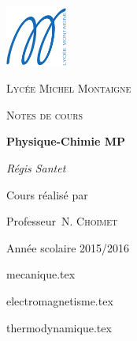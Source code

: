 \documentclass[12pt]{book}
\theoremstyle{definition}
\theoremstyle{remark}
\begin{document}
\begin{titlepage}
    \centering
    \includegraphics[width=0.15\textwidth]{img/logo_lycee_michel_montaigne.png}\par\vspace{1cm}
    {\scshape Lycée Michel Montaigne \par}
    \vspace{1cm}
    {\scshape\Large Notes de cours\par}
    \vspace{1.5cm}
    {\huge\bfseries Physique-Chimie MP\par}
    \vspace{2cm}
    {\Large\itshape Régis Santet\par}
    \vfill
    Cours réalisé par\par
    Professeur~N. \textsc{Choimet}

    \vfill

    {\large Année scolaire 2015/2016\par}
\end{titlepage}


\tableofcontents
\listoffigures
\listoftables

{mecanique.tex}

{electromagnetisme.tex}

{thermodynamique.tex}
\end{document}
